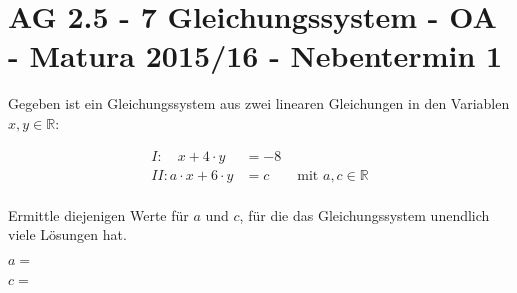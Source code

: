 \section{AG 2.5 - 7 Gleichungssystem - OA - Matura 2015/16
- Nebentermin 1}

\begin{beispiel}[AG 2.5]{1} %
Gegeben ist ein Gleichungssystem aus zwei linearen Gleichungen in den Variablen $x,y \in \mathbb{R}$:

\begin{align*}
I: \quad x+4\cdot y &= -8 \\
II: a\cdot x +6 \cdot y &= c \qquad \text{mit }a,c \in \mathbb{R} \\
\end{align*}


Ermittle diejenigen Werte für $a$ und $c$, für die das Gleichungssystem unendlich viele Lösungen hat. \leer

$a=$ \leer

$c=$ 		
\end{beispiel}
